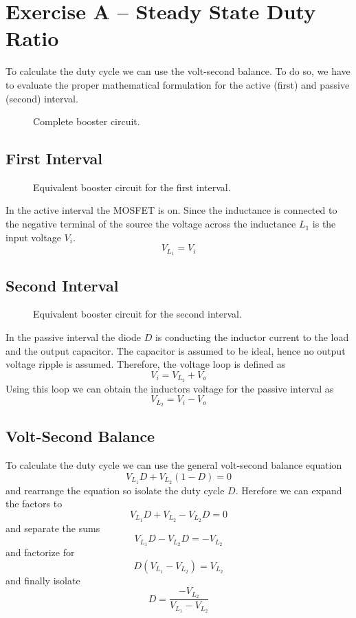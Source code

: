 \section{Exercise A -- Steady State Duty Ratio}
To calculate the duty cycle we can use the volt-second balance.
To do so, we have to evaluate the proper mathematical formulation
for the active (first) and passive (second) interval.

\begin{figure}[h!]
	\centering
	\def\svgscale{\schematicscale}
	
	\caption{Complete booster circuit.}
\end{figure}

\subsection{First Interval}

\begin{figure}[h!]
	\centering
	\def\svgscale{\schematicscale}
	
	\caption{Equivalent booster circuit for the first interval.}
\end{figure}

In the active interval the MOSFET is on. Since the inductance is
connected to the negative terminal of the source the voltage across
the inductance $L_1$ is the input voltage $V_i$. 
\[ V_{L_{1}} = V_i \]

\subsection{Second Interval}

\begin{figure}[h!]
	\centering
	\def\svgscale{\schematicscale}
	
	\caption{Equivalent booster circuit for the second interval.}
\end{figure}

In the passive interval the diode $D$ is conducting the inductor
current to the load and the output capacitor. The capacitor is assumed
to be ideal, hence no output voltage ripple is assumed. Therefore, the
voltage loop is defined as
\[ V_i = V_{L_{2}} + V_o \]
Using this loop we can obtain the inductors voltage for the passive
interval as
\[ V_{L_{2}} = V_i - V_o \]

\subsection{Volt-Second Balance}
To calculate the duty cycle we can use the general volt-second balance
equation
\[ V_{L_{1}} D + V_{L_{2}} (1-D) = 0 \]
and rearrange the equation so isolate the duty cycle $D$. Herefore
we can expand the factors to
\[ V_{L_{1}} D + V_{L_{2}} - V_{L_{2}} D = 0 \]
and separate the sums
\[ V_{L_{1}} D - V_{L_{2}} D = - V_{L_{2}} \]
and factorize for
\[ D (V_{L_{1}} - V_{L_{2}}) = V_{L_{2}} \]
and finally isolate 
\[ D = \frac{- V_{L_{2}}}{V_{L_{1}} - V_{L_{2}}} \]

